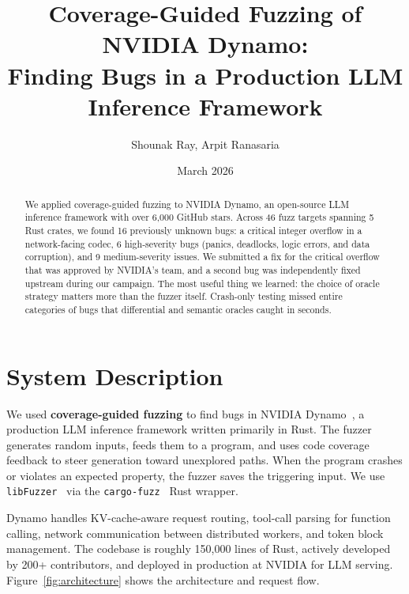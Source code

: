 \documentclass[11pt]{article}
\title{Coverage-Guided Fuzzing of NVIDIA Dynamo:\\Finding Bugs in a Production LLM Inference Framework}
\author{Shounak Ray, Arpit Ranasaria}
\date{March 2026}
\begin{document}
\maketitle

\begin{abstract}
We applied coverage-guided fuzzing to NVIDIA Dynamo, an open-source LLM inference framework with over 6,000 GitHub stars. Across 46 fuzz targets spanning 5 Rust crates, we found 16 previously unknown bugs: a critical integer overflow in a network-facing codec, 6 high-severity bugs (panics, deadlocks, logic errors, and data corruption), and 9 medium-severity issues. We submitted a fix for the critical overflow that was approved by NVIDIA's team, and a second bug was independently fixed upstream during our campaign. The most useful thing we learned: the choice of oracle strategy matters more than the fuzzer itself. Crash-only testing missed entire categories of bugs that differential and semantic oracles caught in seconds.
\end{abstract}

\enlargethispage{2\baselineskip}
\tableofcontents
\newpage

\section{System Description}

We used \textbf{coverage-guided fuzzing} to find bugs in NVIDIA Dynamo~\cite{dynamo}, a production LLM inference framework written primarily in Rust. The fuzzer generates random inputs, feeds them to a program, and uses code coverage feedback to steer generation toward unexplored paths. When the program crashes or violates an expected property, the fuzzer saves the triggering input. We use \texttt{libFuzzer}~\cite{libfuzzer} via the \texttt{cargo-fuzz}~\cite{cargofuzz} Rust wrapper.

Dynamo handles KV-cache-aware request routing, tool-call parsing for function calling, network communication between distributed workers, and token block management. The codebase is roughly 150,000 lines of Rust, actively developed by 200+ contributors, and deployed in production at NVIDIA for LLM serving. Figure~\ref{fig:architecture} shows the architecture and request flow.
\end{document}
